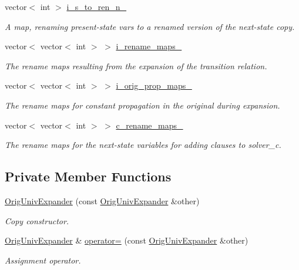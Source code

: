 \begin{DoxyCompactItemize}
vector$<$ int $>$ \hyperlink{classOrigUnivExpander_a03a45566b24c00386d7530f4b212b42d}{i\-\_\-s\-\_\-to\-\_\-ren\-\_\-n\-\_\-}
\begin{DoxyCompactList}\small\item\em A map, renaming present-\/state vars to a renamed version of the next-\/state copy. \end{DoxyCompactList}\item 
vector$<$ vector$<$ int $>$ $>$ \hyperlink{classOrigUnivExpander_ab9e2c9ca2129fed67662f36834198b08}{i\-\_\-rename\-\_\-maps\-\_\-}
\begin{DoxyCompactList}\small\item\em The rename maps resulting from the expansion of the transition relation. \end{DoxyCompactList}\item 
vector$<$ vector$<$ int $>$ $>$ \hyperlink{classOrigUnivExpander_a49a13d81ac5119a0a31aa0bbb8964e25}{i\-\_\-orig\-\_\-prop\-\_\-maps\-\_\-}
\begin{DoxyCompactList}\small\item\em The rename maps for constant propagation in the original during expansion. \end{DoxyCompactList}\item 
vector$<$ vector$<$ int $>$ $>$ \hyperlink{classOrigUnivExpander_a88ffdcc269b3e72eae24c6744b412b4e}{c\-\_\-rename\-\_\-maps\-\_\-}
\begin{DoxyCompactList}\small\item\em The rename maps for the next-\/state variables for adding clauses to solver\-\_\-c. \end{DoxyCompactList}\end{DoxyCompactItemize}
\subsection*{Private Member Functions}
\begin{DoxyCompactItemize}
\item 
\hyperlink{classOrigUnivExpander_afd2271d8565fdd4280eb9952e06f1179}{Orig\-Univ\-Expander} (const \hyperlink{classOrigUnivExpander}{Orig\-Univ\-Expander} \&other)
\begin{DoxyCompactList}\small\item\em Copy constructor. \end{DoxyCompactList}\item 
\hyperlink{classOrigUnivExpander}{Orig\-Univ\-Expander} \& \hyperlink{classOrigUnivExpander_a7a9bdf0d9f02ce1a84a471386fb521f8}{operator=} (const \hyperlink{classOrigUnivExpander}{Orig\-Univ\-Expander} \&other)
\begin{DoxyCompactList}\small\item\em Assignment operator. \end{DoxyCompactList}\end{DoxyCompactItemize}


